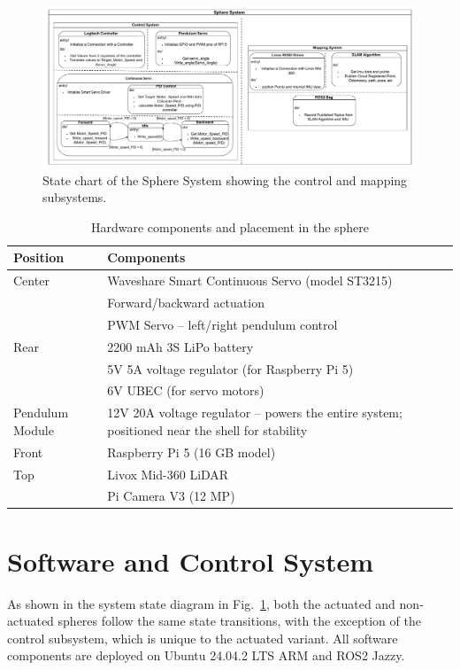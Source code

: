 \documentclass[a4paper, conference]{IEEEtran}
\begin{document}
\begin{figure}
    \centering
    \includegraphics[width=1\linewidth]{pics/Khonsu_diagram.pdf} 
    \caption{State chart of the Sphere System showing the control and mapping subsystems.}
    \label{fig:sphere_system}
\end{figure}
\begin{table}
\centering
\caption{Hardware components and placement in the sphere}
\label{tab:hardware_components_actuated}
\begin{tabularx}{\linewidth}{@{}l X@{}}
\toprule
\textbf{Position} & \textbf{Components} \\
\midrule
Center & Waveshare Smart Continuous Servo (model ST3215) \\
       & Forward/backward actuation \\
       & PWM Servo – left/right pendulum control \\
Rear   & 2200 mAh 3S LiPo battery \\
       & 5V 5A voltage regulator (for Raspberry Pi 5) \\
       & 6V UBEC (for servo motors) \\
Pendulum Module & 12V 20A voltage regulator – powers the entire system; positioned near the shell for stability \\
Front  & Raspberry Pi 5 (16 GB model) \\
Top    & Livox Mid-360 LiDAR \\
       & Pi Camera V3 (12 MP) \\
\bottomrule
\end{tabularx}
\vspace{-2mm}
\end{table}

\section{Software and Control System}
As shown in the system state diagram in Fig.~\ref{fig:sphere_system}, both the actuated and non-actuated spheres follow the same state transitions, with the exception of the control subsystem, which is unique to the actuated variant. 
All software components are deployed on Ubuntu 24.04.2 LTS ARM and ROS2 Jazzy.
\end{document}
